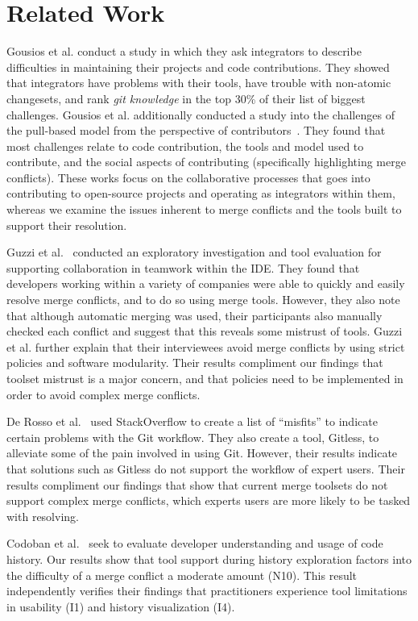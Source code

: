 \section{Related Work}\label{related_work}

Gousios et al. \cite{integrator_perspective} conduct a study in which they ask integrators to describe difficulties in maintaining their projects and code contributions. 
They showed that integrators have problems with their tools, have trouble with non-atomic changesets, and rank \textit{git knowledge} in the top 30\% of their list of biggest challenges. 
Gousios et al. additionally conducted a study into the challenges of the pull-based model from the perspective of contributors~\cite{gousios2016work}. 
They found that most challenges relate to code contribution, the tools and model used to contribute, and the social aspects of contributing (specifically highlighting merge conflicts).
These works focus on the collaborative processes that goes into contributing to open-source projects and operating as integrators within them, whereas we examine the issues inherent to merge conflicts and the tools built to support their resolution.

Guzzi et al.~\cite{Guzzi2015} conducted an exploratory investigation and tool evaluation for supporting collaboration in teamwork within the IDE.
They found that developers working within a variety of companies were able to quickly and easily resolve merge conflicts, and to do so using merge tools.
However, they also note that although automatic merging was used, their participants also manually checked each conflict and suggest that this reveals some mistrust of tools.
Guzzi et al. further explain that their interviewees avoid merge conflicts by using strict policies and software modularity.
Their results compliment our findings that toolset mistrust is a major concern, and that policies need to be implemented in order to avoid complex merge conflicts.

De Rosso et al.~\cite{DeRosso2016} used StackOverflow to create a list of ``misfits'' to indicate certain problems with the Git workflow. 
They also create a tool, Gitless, to alleviate some of the pain involved in using Git.
However, their results indicate that solutions such as Gitless do not support the workflow of expert users.
Their results compliment our findings that show that current merge toolsets do not support complex merge conflicts, which experts users are more likely to be tasked with resolving.

Codoban et al.~\cite{Mihai_lenses} seek to evaluate developer understanding and usage of code history. Our results show that tool support during history exploration factors into the difficulty of a merge conflict a moderate amount (N10). This result independently verifies their findings that practitioners experience tool limitations in usability (I1) and history visualization (I4).